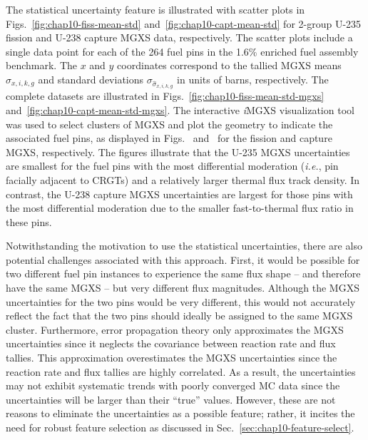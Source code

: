 The statistical uncertainty feature is illustrated with scatter plots in Figs.~\ref{fig:chap10-fiss-mean-std} and~\ref{fig:chap10-capt-mean-std} for 2-group U-235 fission and U-238 capture \ac{MGXS} data, respectively. The scatter plots include a single data point for each of the 264 fuel pins in the 1.6\% enriched fuel assembly benchmark. The $x$ and $y$ coordinates correspond to the tallied \ac{MGXS} means $\hat{\sigma}_{x,i,k,g}$ and standard deviations $\sigma_{\hat{\sigma}_{x,i,k,g}}$ in units of barns, respectively. The complete datasets are illustrated in Figs.~\ref{fig:chap10-fiss-mean-std-mgxs} and~\ref{fig:chap10-capt-mean-std-mgxs}. The interactive \textit{i}\ac{MGXS} visualization tool was used to select clusters of \ac{MGXS} and plot the geometry to indicate the associated fuel pins, as displayed in Figs.~ and~ for the fission and capture \ac{MGXS}, respectively. The figures illustrate that the U-235 \ac{MGXS} uncertainties are smallest for the fuel pins with the most differential moderation (\textit{i.e.}, pin facially adjacent to \acp{CRGT}) and a relatively larger thermal flux track density. In contrast, the U-238 capture \ac{MGXS} uncertainties are largest for those pins with the most differential moderation due to the smaller fast-to-thermal flux ratio in these pins.

Notwithstanding the motivation to use the statistical uncertainties, there are also potential challenges associated with this approach. First, it would be possible for two different fuel pin instances to experience the same flux shape -- and therefore have the same \ac{MGXS} -- but very different flux magnitudes. Although the \ac{MGXS} uncertainties for the two pins would be very different, this would not accurately reflect the fact that the two pins should ideally be assigned to the same \ac{MGXS} cluster. Furthermore, error propagation theory only approximates the \ac{MGXS} uncertainties since it neglects the covariance between reaction rate and flux tallies. This approximation overestimates the \ac{MGXS} uncertainties since the reaction rate and flux tallies are highly correlated. As a result, the uncertainties may not exhibit systematic trends with poorly converged \ac{MC} data since the uncertainties will be larger than their ``true'' values. However, these are not reasons to eliminate the uncertainties as a possible feature; rather, it incites the need for robust feature selection as discussed in Sec.~\ref{sec:chap10-feature-select}.

